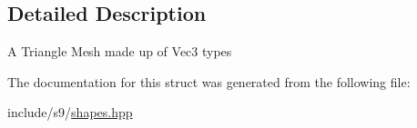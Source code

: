 \subsection{Detailed Description}
A Triangle Mesh made up of Vec3 types 

The documentation for this struct was generated from the following file\-:\begin{DoxyCompactItemize}
\item 
include/s9/\hyperlink{shapes_8hpp}{shapes.\-hpp}\end{DoxyCompactItemize}
